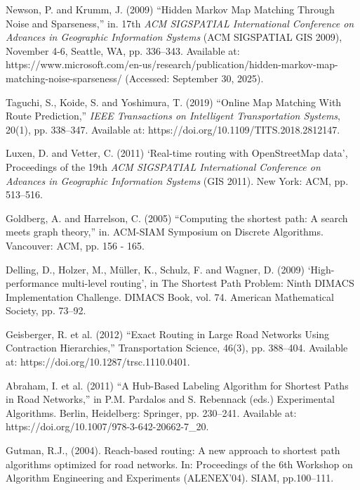 \begin{thebibliography}{99}
        Newson, P. and Krumm, J. (2009) “Hidden Markov Map Matching Through Noise and Sparseness,” in. 17th \textit{ACM SIGSPATIAL International Conference on Advances in Geographic Information Systems} (ACM SIGSPATIAL GIS 2009), November 4-6, Seattle, WA, pp. 336–343. Available at: https://www.microsoft.com/en-us/research/publication/hidden-markov-map-matching-noise-sparseness/ (Accessed: September 30, 2025).


        Taguchi, S., Koide, S. and Yoshimura, T. (2019) “Online Map Matching With Route Prediction,” \textit{IEEE Transactions on Intelligent Transportation Systems}, 20(1), pp. 338–347. Available at: https://doi.org/10.1109/TITS.2018.2812147.

        Luxen, D. and Vetter, C. (2011) ‘Real-time routing with OpenStreetMap data’, Proceedings of the 19th \textit{ACM SIGSPATIAL International Conference on Advances in Geographic Information Systems }(GIS 2011). New York: ACM, pp. 513–516.

        Goldberg, A. and Harrelson, C. (2005) “Computing the shortest path: A search meets graph theory,” in. ACM-SIAM Symposium on Discrete Algorithms. Vancouver: ACM, pp. 156 - 165.
        
        Delling, D., Holzer, M., Müller, K., Schulz, F. and Wagner, D. (2009) ‘High-performance multi-level routing’, in The Shortest Path Problem: Ninth DIMACS Implementation Challenge. DIMACS Book, vol. 74. American Mathematical Society, pp. 73–92.

        Geisberger, R. et al. (2012) “Exact Routing in Large Road Networks Using Contraction Hierarchies,” Transportation Science, 46(3), pp. 388–404. Available at: https://doi.org/10.1287/trsc.1110.0401.

        Abraham, I. et al. (2011) “A Hub-Based Labeling Algorithm for Shortest Paths in Road Networks,” in P.M. Pardalos and S. Rebennack (eds.) Experimental Algorithms. Berlin, Heidelberg: Springer, pp. 230–241. Available at: https://doi.org/10.1007/978-3-642-20662-7\_20.


        Gutman, R.J., (2004). Reach-based routing: A new approach to shortest path algorithms optimized for road networks. In: Proceedings of the 6th Workshop on Algorithm Engineering and Experiments (ALENEX’04). SIAM, pp.100–111.


\end{thebibliography}
